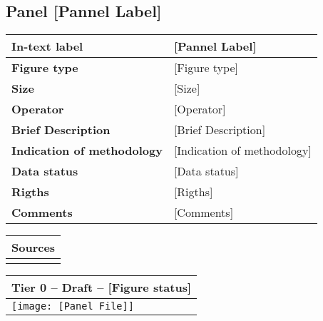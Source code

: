\clearpage

\subsection{Panel [Pannel Label]} \label{subsec_[Pannel Label]}

\small

\begin{table}[h!] %
\centering
\small %
\sffamily %
\begin{tabular}{| m{6cm} | m{8cm} |}
    \hline
    \textbf{In-text label} & [Pannel Label] \\
    \hline
    \textbf{Figure type} & [Figure type] \\
    \hline
    \textbf{Size} & [Size] \\
    \hline
    \textbf{Operator} & [Operator] \\
    \hline
    \textbf{Brief Description} & [Brief Description] \\
    \hline
    \textbf{Indication of methodology} & [Indication of methodology] \\
    \hline
    \textbf{Data status} & [Data status] \\
    \hline
    \textbf{Rigths} & [Rigths] \\
    \hline
    \textbf{Comments} & [Comments]\\
    \hline
    \end{tabular}
\end{table}

\begin{table}[h!] %
\centering
\small %
\sffamily %
\begin{tabular}{| m{14.5cm} |}
    \hline
    \textbf{Sources} \\
    \hline
    [Sources] \\
    \hline
    \end{tabular}
\end{table}

\begin{table}[h!] %
\centering
\small %
\sffamily %
\begin{tabular}{| m{14.5cm} |}
    \hline
    \textbf{Tier 0 -- Draft -- [Figure status]} \\
    \hline
    \hspace{5pt} \rule{0pt}{10pt} \texttt{[image: [Panel File]]} \rule[-5pt]{0pt}{10pt}\\
    \hline
    \end{tabular}
\end{table}